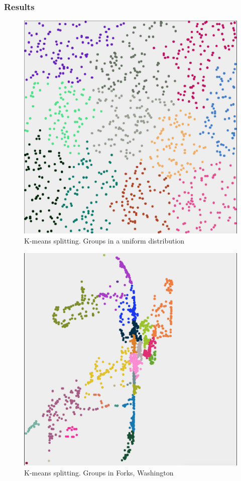 \subsubsection{Results}

\begin{figure}[h]
	\center
	\includegraphics[scale=0.46]{Images/computations/KMEANS500x500_1000n.jpg}
	\caption{K-means splitting. Groups in a uniform distribution}
	\label{fig:kmeans_uniform}
\end{figure}

\begin{figure}[h]
	\center
	\includegraphics[scale=0.46]{Images/computations/KMEANSForks.jpg}
	\caption{K-means splitting. Groups in Forks, Washington}
	\label{fig:kmeans_forks}
\end{figure}





